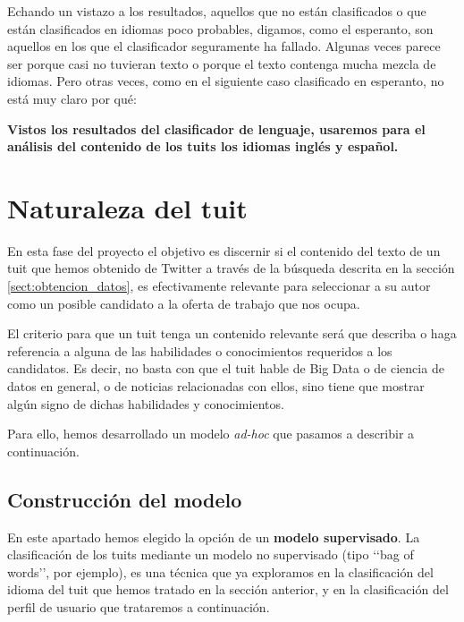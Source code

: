 Echando un vistazo a los resultados, aquellos que no están clasificados o que están
clasificados en idiomas poco probables, digamos, como el esperanto, son aquellos en los
que el clasificador seguramente ha fallado. Algunas veces parece ser porque casi no 
tuvieran texto o porque el texto contenga mucha mezcla de idiomas. Pero otras veces, 
como en el siguiente caso clasificado en esperanto, no está muy claro por qué:



{\bf Vistos los resultados del clasificador de lenguaje, usaremos para el análisis del 
contenido de los tuits los idiomas inglés y español.}

\section{Naturaleza del tuit}
\label{sect:tuits_relevantes}

En esta fase del proyecto el objetivo es discernir si el contenido del texto de un tuit que hemos
obtenido de Twitter a través de la búsqueda descrita en la sección \ref{sect:obtencion_datos},
es efectivamente relevante para seleccionar a su autor como un posible candidato
a la oferta de trabajo que nos ocupa.

El criterio para que un tuit tenga un contenido relevante será que describa o haga referencia
a alguna de las habilidades o conocimientos requeridos a los candidatos. Es decir, no 
basta con que el tuit hable de Big Data o de ciencia de datos en general, o de noticias 
relacionadas con ellos, sino tiene que mostrar algún signo de dichas habilidades y conocimientos.

Para ello, hemos desarrollado un modelo {\em ad-hoc} que pasamos a describir a continuación.

\subsection{Construcción del modelo}
En este apartado hemos elegido la opción de un {\bf modelo supervisado}. La clasificación de los
tuits mediante un modelo no supervisado (tipo \lq\lq bag of words\rq\rq, por ejemplo), 
es una técnica que ya exploramos en la clasificación del idioma del tuit que hemos 
tratado en la sección anterior, y en la clasificación del perfil de usuario que trataremos
a continuación.  

